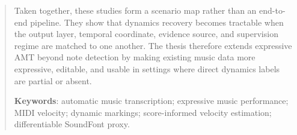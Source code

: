 \documentclass[12pt,a4paper,twoside,openright,final,titlepage]{report}
\newcommand\mainmatter{\cleardoublepage\pagenumbering{arabic}}
\begin{document}
\begin{abstract}
	Taken together, these studies form a scenario map rather than an end-to-end pipeline. They show that dynamics recovery becomes tractable when the output layer, temporal coordinate, evidence source, and supervision regime are matched to one another. The thesis therefore extends expressive AMT beyond note detection by making existing music data more expressive, editable, and usable in settings where direct dynamics labels are partial or absent.
		
	\textbf{Keywords}: automatic music transcription; expressive music performance; MIDI velocity; dynamic markings; score-informed velocity estimation; differentiable SoundFont proxy.
	\end{abstract}
	
	
	
    
    
	\setcounter{tocdepth}{2}
	\tableofcontents
	\listoffigures
	\listoftables
	

	\mainmatter
	\hypersetup{pageanchor=true}
	\raggedbottom
	
	
	
	
	
	
	

\cleardoublepage
%  
\renewcommand{\bibname}{References}


\end{document}
